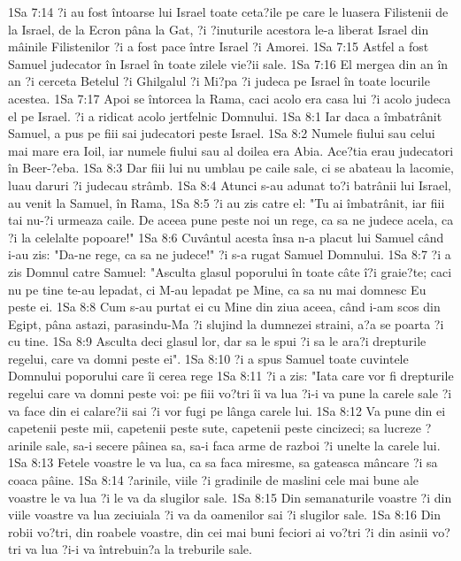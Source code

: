 1Sa 7:14  ?i au fost întoarse lui Israel toate ceta?ile pe care le luasera Filistenii de la Israel, de la Ecron pâna la Gat, ?i ?inuturile acestora le-a liberat Israel din mâinile Filistenilor ?i a fost pace între Israel ?i Amorei.
1Sa 7:15  Astfel a fost Samuel judecator în Israel în toate zilele vie?ii sale.
1Sa 7:16  El mergea din an în an ?i cerceta Betelul ?i Ghilgalul ?i Mi?pa ?i judeca pe Israel în toate locurile acestea.
1Sa 7:17  Apoi se întorcea la Rama, caci acolo era casa lui ?i acolo judeca el pe Israel. ?i a ridicat acolo jertfelnic Domnului.
1Sa 8:1  Iar daca a îmbatrânit Samuel, a pus pe fiii sai judecatori peste Israel.
1Sa 8:2  Numele fiului sau celui mai mare era Ioil, iar numele fiului sau al doilea era Abia. Ace?tia erau judecatori în Beer-?eba.
1Sa 8:3  Dar fiii lui nu umblau pe caile sale, ci se abateau la lacomie, luau daruri ?i judecau strâmb.
1Sa 8:4  Atunci s-au adunat to?i batrânii lui Israel, au venit la Samuel, în Rama,
1Sa 8:5  ?i au zis catre el: "Tu ai îmbatrânit, iar fiii tai nu-?i urmeaza caile. De aceea pune peste noi un rege, ca sa ne judece acela, ca ?i la celelalte popoare!"
1Sa 8:6  Cuvântul acesta însa n-a placut lui Samuel când i-au zis: "Da-ne rege, ca sa ne judece!" ?i s-a rugat Samuel Domnului.
1Sa 8:7  ?i a zis Domnul catre Samuel: "Asculta glasul poporului în toate câte î?i graie?te; caci nu pe tine te-au lepadat, ci M-au lepadat pe Mine, ca sa nu mai domnesc Eu peste ei.
1Sa 8:8  Cum s-au purtat ei cu Mine din ziua aceea, când i-am scos din Egipt, pâna astazi, parasindu-Ma ?i slujind la dumnezei straini, a?a se poarta ?i cu tine.
1Sa 8:9  Asculta deci glasul lor, dar sa le spui ?i sa le ara?i drepturile regelui, care va domni peste ei".
1Sa 8:10  ?i a spus Samuel toate cuvintele Domnului poporului care îi cerea rege
1Sa 8:11  ?i a zis: "Iata care vor fi drepturile regelui care va domni peste voi: pe fiii vo?tri îi va lua ?i-i va pune la carele sale ?i va face din ei calare?ii sai ?i vor fugi pe lânga carele lui.
1Sa 8:12  Va pune din ei capetenii peste mii, capetenii peste sute, capetenii peste cincizeci; sa lucreze ?arinile sale, sa-i secere pâinea sa, sa-i faca arme de razboi ?i unelte la carele lui.
1Sa 8:13  Fetele voastre le va lua, ca sa faca miresme, sa gateasca mâncare ?i sa coaca pâine.
1Sa 8:14  ?arinile, viile ?i gradinile de maslini cele mai bune ale voastre le va lua ?i le va da slugilor sale.
1Sa 8:15  Din semanaturile voastre ?i din viile voastre va lua zeciuiala ?i va da oamenilor sai ?i slugilor sale.
1Sa 8:16  Din robii vo?tri, din roabele voastre, din cei mai buni feciori ai vo?tri ?i din asinii vo?tri va lua ?i-i va întrebuin?a la treburile sale.
